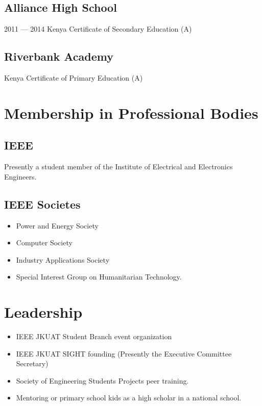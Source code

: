 \documentclass[a4paper]{article}
\begin{document}
\subsection{Alliance High School}
2011 --- 2014
Kenya Certificate of Secondary Education (A)
\subsection{Riverbank Academy}
Kenya Certificate of Primary Education (A)


\section{Membership in Professional Bodies}
\subsection{IEEE}
Presently a student member of the Institute of Electrical and Electronics Engineers.
\subsection{IEEE Societes}
\begin{itemize}
	\item Power and Energy Society
	\item Computer Society
	\item Industry Applications Society
	\item Special Interest Group on Humanitarian Technology.
\end{itemize}

\section{Leadership}
\begin{itemize}
	\item IEEE JKUAT Student Branch event organization
	\item IEEE JKUAT SIGHT founding (Presently the Executive Committee Secretary)
	\item Society of Engineering Students Projects peer training.
	\item Mentoring or primary school kids as a high scholar in a national school.
\end{itemize}
\end{document}
